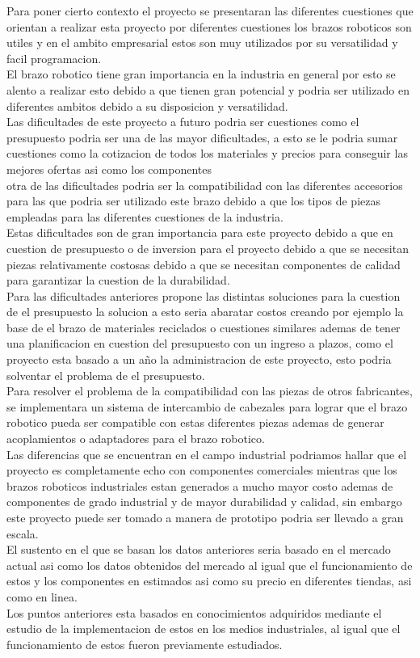 \documentclass[14pt,a4paper]{article}
\begin{document}
Para poner cierto contexto el proyecto se presentaran las diferentes cuestiones que orientan a realizar esta proyecto  por diferentes cuestiones los brazos roboticos son utiles y en el ambito empresarial estos son muy utilizados por su versatilidad y facil programacion.\\
El brazo robotico tiene gran importancia en la industria en general por esto se alento a realizar esto debido a que tienen gran potencial y podria ser utilizado en diferentes ambitos debido a su disposicion y versatilidad.\\
Las dificultades de este proyecto a futuro podria ser cuestiones como el presupuesto podria ser una de las mayor dificultades, a esto se le podria sumar cuestiones como la cotizacion de todos los materiales y precios para conseguir las mejores ofertas asi como los componentes\\
otra de las dificultades podria ser la compatibilidad con las diferentes accesorios para las que podria ser utilizado este brazo debido a que los tipos de piezas empleadas para las diferentes cuestiones de la industria.\\
Estas dificultades son de gran importancia para este proyecto debido a que en cuestion de presupuesto o de inversion para el proyecto debido a que se necesitan piezas relativamente costosas debido a que se necesitan componentes de calidad para garantizar la cuestion de la durabilidad.\\
Para las dificultades anteriores propone las distintas soluciones para la cuestion de el presupuesto la solucion a esto seria abaratar costos creando por ejemplo la base de el brazo de materiales reciclados o cuestiones similares ademas de tener una planificacion en cuestion del presupuesto con un ingreso a plazos, como el proyecto esta basado a un año la administracion de este proyecto, esto podria solventar el problema de el presupuesto.\\
Para resolver el problema de la compatibilidad con las piezas de otros fabricantes, se implementara un sistema de intercambio de cabezales para lograr que el brazo robotico pueda ser compatible con estas diferentes piezas ademas de generar acoplamientos o adaptadores para el brazo robotico. \\
Las diferencias que se encuentran en el campo industrial podriamos hallar que el proyecto es completamente echo con componentes comerciales mientras que los brazos roboticos industriales estan generados a mucho mayor costo ademas de componentes de grado industrial y de mayor durabilidad y calidad, sin embargo este proyecto puede ser tomado a manera de prototipo podria ser llevado a gran escala.\\
El sustento en el que se basan los datos anteriores seria basado en el mercado actual asi como los datos obtenidos del mercado al igual que el funcionamiento de estos y los componentes en estimados asi como su precio en diferentes tiendas, asi como en linea.\\
Los puntos anteriores esta basados en conocimientos adquiridos mediante el estudio de la implementacion de estos en los medios industriales, al igual que el funcionamiento de estos fueron previamente estudiados.
\end{document}
